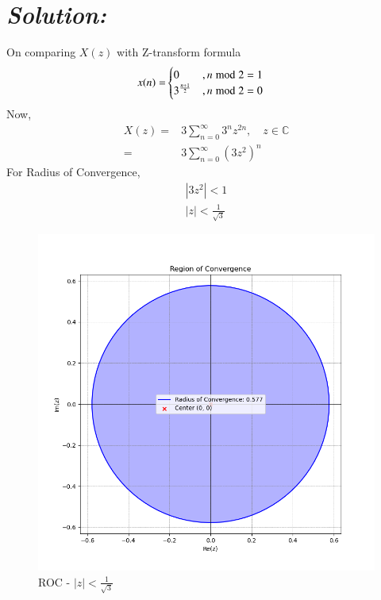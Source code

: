 \documentclass[journal,12pt,twocolumn]{IEEEtran}
\theoremstyle{remark}
\begin{document}
\section*{\textit{\textbf{Solution:}}}

On comparing $X(z)$ with Z-transform formula\\ 
\begin{align}
x(n)=&
\begin{cases}
0 & ,n\hspace{1mm}\text{mod} \hspace{1mm} 2=1 \\ 3^{\frac{n+1}{2}}& ,n \hspace{1mm}\text{mod} \hspace{1mm} 2=0\end{cases}
\end{align}
Now,
\begin{align}
X(z) =& 3\sum_{n=0}^{\infty} 3^{n}z^{2n}, \quad z \in \mathbb{C}\\
=&3\sum_{n=0}^{\infty} {(3z^{2})}^{n}
 \end{align}
 For Radius of Convergence,
 \begin{align}
|3z^2| < 1\\
|z| < \frac{1}{\sqrt{3}}
 \end{align}
 \begin{figure}[h]
\renewcommand\thefigure{1}
    \centering
    \includegraphics[width=0.8\columnwidth]{figs/fig1.png}
    \caption{ROC - $|z|< \frac{1}{\sqrt{3}}$}
    \label{Fig1_GATE MA 28}
\end{figure}
\end{document}
